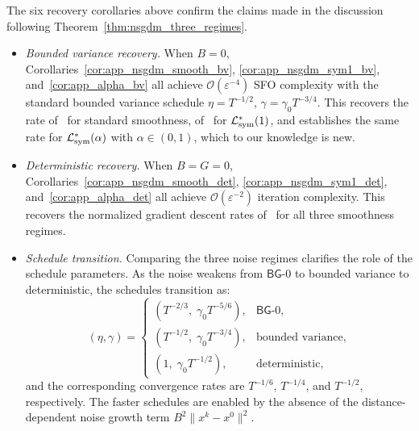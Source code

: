 \documentclass[letter,11pt]{article}
\newcommand{\Ocal}{\mathcal{O}}
\newcommand{\Lcal}{\mathcal{L}}
\begin{document}
The six recovery corollaries above confirm the claims made in the discussion
following Theorem~\ref{thm:nsgdm_three_regimes}.

\begin{itemize}[leftmargin=*,label=\textbullet]
    \item \textit{Bounded variance recovery.}
    When $B=0$, Corollaries~\ref{cor:app_nsgdm_smooth_bv},
    \ref{cor:app_nsgdm_sym1_bv}, and~\ref{cor:app_alpha_bv} all achieve
    $\Ocal(\varepsilon^{-4})$ SFO complexity with the standard bounded variance
    schedule $\eta=T^{-1/2}$, $\gamma=\gamma_0 T^{-3/4}$. This recovers the
    rate of~\citet{cutkosky2020momentum} for standard smoothness,
    of~\citet{khirirat2026error} for $\Lcal_{\rm sym}^*(1)$, and establishes
    the same rate for $\Lcal_{\rm sym}^*(\alpha)$ with $\alpha\in(0,1)$, which
    to our knowledge is new.

    \item \textit{Deterministic recovery.}
    When $B=G=0$, Corollaries~\ref{cor:app_nsgdm_smooth_det},
    \ref{cor:app_nsgdm_sym1_det}, and~\ref{cor:app_alpha_det} all achieve
    $\Ocal(\varepsilon^{-2})$ iteration complexity. This recovers the
    normalized gradient descent rates of~\citet{chen2023generalized} for all
    three smoothness regimes.

    \item \textit{Schedule transition.}
    Comparing the three noise regimes clarifies the role of the schedule
    parameters. As the noise weakens from $\mathsf{BG}$-0 to bounded variance
    to deterministic, the schedules transition as:
    \[
        (\eta, \gamma)
        =
        \begin{cases}
            (T^{-2/3},\;\gamma_0 T^{-5/6}), & \mathsf{BG}\text{-}0, \\[3pt]
            (T^{-1/2},\;\gamma_0 T^{-3/4}), & \text{bounded variance}, \\[3pt]
            (1,\;\gamma_0 T^{-1/2}), & \text{deterministic},
        \end{cases}
    \]
    and the corresponding convergence rates are
    $T^{-1/6}$, $T^{-1/4}$, and $T^{-1/2}$, respectively. The faster
    schedules are enabled by the absence of the distance-dependent noise growth
    term $B^2\|x^k-x^0\|^2$.
\end{itemize}
\newpage
\end{document}
